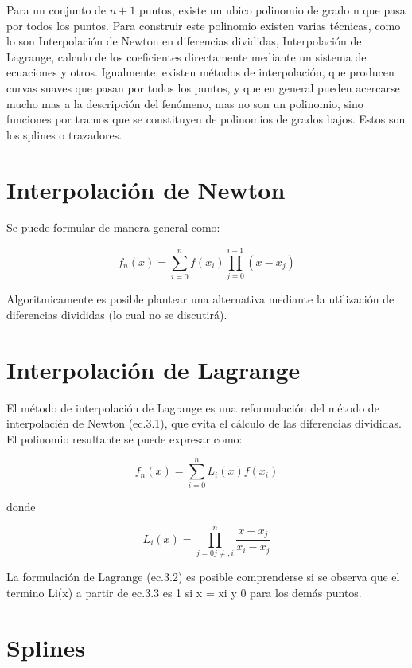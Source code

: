 \documentclass[letterpaper,10pt,oneside]{sphinxmanual}
\theoremstyle{plain}%
\theoremstyle{definition}%
\theoremstyle{remark}%
\begin{document}
\noindent Para un conjunto de $n + 1$ puntos, existe un ubico polinomio de grado n que pasa por todos los puntos. Para construir este polinomio existen varias técnicas, como lo son Interpolación de Newton en diferencias divididas, Interpolación de Lagrange, calculo de los coeficientes directamente mediante un sistema de ecuaciones y otros. Igualmente, existen métodos de interpolación, que producen curvas suaves que pasan por todos los puntos, y que en general pueden acercarse mucho mas a la descripción del fenómeno, mas no son un polinomio, sino funciones por tramos que se constituyen de polinomios de grados bajos. Estos son los splines o trazadores.\medskip

\section{Interpolación de Newton}

Se puede formular de manera general como:

\begin{equation}
	f_n(x) = \sum\limits_{i=0}^{n}f(x_i)\prod\limits_{j=0}^{i-1}(x-x_j)
\end{equation}

Algoritmicamente es posible plantear una alternativa mediante la utilización de
diferencias divididas (lo cual no se discutirá).

\section{Interpolación de Lagrange}

El método de interpolación de Lagrange es una reformulación del método de
interpolacién de Newton (ec.3.1), que evita el cálculo de las diferencias divididas.
El polinomio resultante se puede expresar como:

\begin{equation}
	f_n(x)=\sum\limits_{i=0}^{n}L_i(x)f(x_i)
\end{equation}

donde

\begin{equation}
	L_i(x)=\prod\limits_{j=0j \neq,i}^{n}\frac{x-x_j}{x_i-x_j}
\end{equation}

La formulación de Lagrange (ec.3.2) es posible comprenderse si se observa que el
termino Li(x) a partir de ec.3.3 es 1 si x = xi y 0 para los demás puntos.

\section{Splines}
\end{document}
